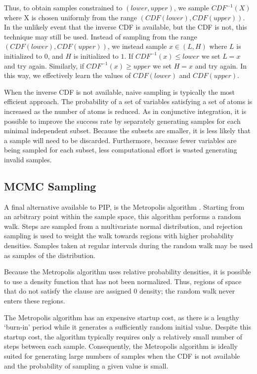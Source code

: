 Thus, to obtain samples constrained  to  $(lower, upper)$, we
sample  $CDF^{-1}(X)$  where X  is  chosen  uniformly  from the  range
$(CDF(lower), CDF(upper))$.   In the  unlikely event that  the inverse
CDF is  available, but  the CDF  is not, this  technique may  still be
used.  Instead of sampling  from the range $(CDF(lower), CDF(upper))$,
we instead sample  $x \in (L,H)$ where $L$ is  initialized to $0$, and
$H$ is initialized to $1$.  If $CDF^{-1}(x) \leq lower$ we set $L = x$
and try again.  Similarly, if $CDF^{-1}(x)  \geq upper$ we set $H = x$
and  try again.   In  this way,  we  effectively learn  the values  of
$CDF(lower)$ and $CDF(upper)$.

When the inverse CDF is not available, naive sampling is typically the
most  efficient  approach.  The  probability  of  a  set of  variables
satisfying  a set  of atoms  is increased  as the  number of  atoms is
reduced.  As in conjunctive integration, it is possible to improve the
success  rate  by  separately  generating  samples  for  each  minimal
independent  subset.  Because  the  subsets are  smaller,  it is  less
likely that a sample will  need to be discarded.  Furthermore, because
fewer variables are being  sampled for each subset, less computational
effort is wasted generating invalid samples.

\subsection{MCMC Sampling}

A final alternative available to PIP, is the
Metropolis  algorithm \cite{metropolis}.   Starting from  an arbitrary
point within the sample space,  this algorithm performs a random walk.
Steps  are  sampled  from  a  multivariate  normal  distribution,  and
rejection sampling  is used  to weight the  walk towards  regions with
higher  probability  densities.  Samples  taken  at regular  intervals
during the random walk may be used as samples of the distribution.

Because the Metropolis  algorithm uses relative probability densities,
it is possible to use a density function that has not been normalized.
Thus, regions of  space that do not satisfy the  clause are assigned 0
density; the random walk never enters these regions.

The Metropolis algorithm has an  expensive startup cost, as there is a
lengthy  `burn-in' period  while  it generates  a sufficiently  random
initial  value.  Despite  this startup  cost, the  algorithm typically
requires only a relatively small  number of steps between each sample.
Consequently,   the  Metropolis  algorithm   is  ideally   suited  for
generating large numbers of samples  when the CDF is not available and
the probability of sampling a given value is small.

